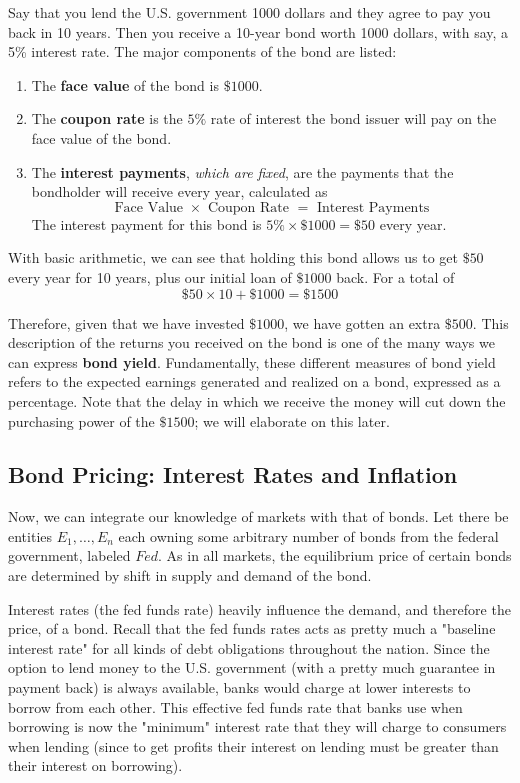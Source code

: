 \documentclass{article}
\begin{document}
    Say that you lend the U.S. government 1000 dollars and they agree to pay you back in 10 years. Then you receive a 10-year bond worth 1000 dollars, with say, a 5\% interest rate. The major components of the bond are listed:
    \begin{enumerate}
      \item The \textbf{face value} of the bond is $\$1000$.
      \item The \textbf{coupon rate} is the $5\%$ rate of interest the bond issuer will pay on the face value of the bond.
      \item The \textbf{interest payments}, \textit{which are fixed}, are the payments that the bondholder will receive every year, calculated as
      \begin{equation}
        \text{Face Value } \times \text{ Coupon Rate } = \text{ Interest Payments}
      \end{equation}
      The interest payment for this bond is $5\% \times \$1000 = \$50$ every year.
    \end{enumerate}
    With basic arithmetic, we can see that holding this bond allows us to get $\$50$ every year for 10 years, plus our initial loan of $\$1000$ back. For a total of
    \begin{equation}
      \$50 \times 10 + \$1000 = \$1500
    \end{equation}

    Therefore, given that we have invested $\$1000$, we have gotten an extra $\$500$. This description of the returns you received on the bond is one of the many ways we can express \textbf{bond yield}. Fundamentally, these different measures of bond yield refers to the expected earnings generated and realized on a bond, expressed as a percentage. Note that the delay in which we receive the money will cut down the purchasing power of the $\$1500$; we will elaborate on this later.

  \subsection{Bond Pricing: Interest Rates and Inflation}

    Now, we can integrate our knowledge of markets with that of bonds. Let there be entities $E_1, \ldots, E_n$ each owning some arbitrary number of bonds from the federal government, labeled $Fed$. As in all markets, the equilibrium price of certain bonds are determined by shift in supply and demand of the bond.

    Interest rates (the fed funds rate) heavily influence the demand, and therefore the price, of a bond. Recall that the fed funds rates acts as pretty much a "baseline interest rate" for all kinds of debt obligations throughout the nation. Since the option to lend money to the U.S. government (with a pretty much guarantee in payment back) is always available, banks would charge at lower interests to borrow from each other. This effective fed funds rate that banks use when borrowing is now the "minimum" interest rate that they will charge to consumers when lending (since to get profits their interest on lending must be greater than their interest on borrowing).
\end{document}
